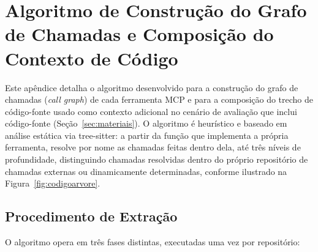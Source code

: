\section{Algoritmo de Construção do Grafo de Chamadas e Composição do Contexto de Código}
\label{apendice:secao}

Este apêndice detalha o algoritmo desenvolvido para a construção do grafo de
chamadas (\textit{call graph}) de cada ferramenta MCP e para a composição do
trecho de código-fonte usado como contexto adicional no cenário de avaliação
que inclui código-fonte (Seção~\ref{sec:materiais}). O algoritmo é
heurístico e baseado em análise estática via tree-sitter: a partir da função
que implementa a própria ferramenta, resolve por nome as chamadas feitas
dentro dela, até três níveis de profundidade, distinguindo chamadas
resolvidas dentro do próprio repositório de chamadas externas ou
dinamicamente determinadas, conforme ilustrado na Figura~\ref{fig:codigoarvore}.

\subsection*{Procedimento de Extração}
O algoritmo opera em três fases distintas, executadas uma vez por repositório:

